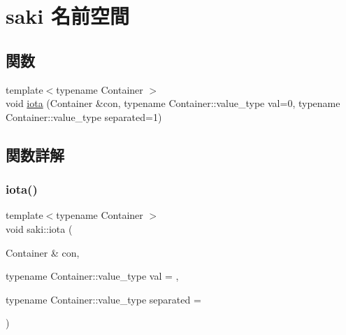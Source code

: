 \hypertarget{namespacesaki}{}\section{saki 名前空間}
\label{namespacesaki}
\subsection*{関数}
\begin{DoxyCompactItemize}
\item 
{\footnotesize template$<$typename Container $>$ }\\void \mbox{\hyperlink{namespacesaki_a0344e3bf75bdcb9067cbdf4b24a41530}{iota}} (Container \&con, typename Container\+::value\+\_\+type val=0, typename Container\+::value\+\_\+type separated=1)
\end{DoxyCompactItemize}


\subsection{関数詳解}
\mbox{\label{namespacesaki_a0344e3bf75bdcb9067cbdf4b24a41530}} 
\subsubsection{\texorpdfstring{iota()}{iota()}}
{\footnotesize\ttfamily template$<$typename Container $>$ \\
void saki\+::iota (\begin{DoxyParamCaption}\item[{Container \&}]{con,  }\item[{typename Container\+::value\+\_\+type}]{val = {},  }\item[{typename Container\+::value\+\_\+type}]{separated = {} }\end{DoxyParamCaption})}

